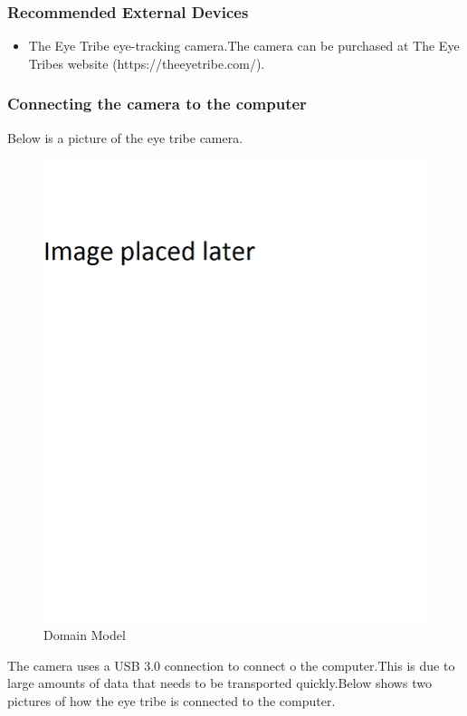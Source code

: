 \subsubsection{Recommended External Devices}
\begin{itemize}
\item The Eye Tribe eye-tracking camera.The camera can be purchased at The Eye Tribes website (https://theeyetribe.com/).
\end{itemize}

\subsubsection{Connecting the camera to the computer}
Below is a picture of the eye tribe camera. 

	\begin{figure}[!ht]
		\centering
		\includegraphics[scale=0.5, width=15cm, keepaspectratio]{./Images/default.png}
		\caption{Domain Model}
		\label{Domain Model}
	\end{figure}

The camera uses a  USB 3.0 connection to connect o the computer.This is due to large amounts of data that needs to be transported quickly.Below shows two pictures of how the eye tribe is connected to the computer.

